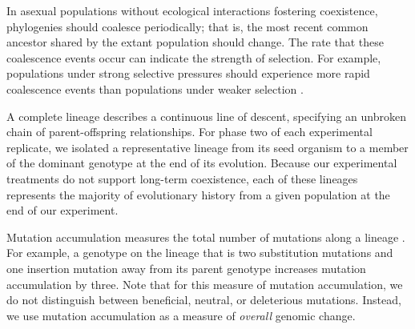 In asexual populations without ecological interactions fostering coexistence, phylogenies should coalesce periodically; that is, the most recent common ancestor shared by the extant population should change.
The rate that these coalescence events occur can indicate the strength of selection.
For example, populations under strong selective pressures should experience more rapid coalescence events than populations under weaker selection \citep{dolson_interpreting_2020}.


A complete lineage describes a continuous line of descent, specifying an unbroken chain of parent-offspring relationships.
For phase two of each experimental replicate, we isolated a representative lineage from its seed organism to a member of the dominant genotype at the end of its evolution.
Because our experimental treatments do not support long-term coexistence, each of these lineages represents the majority of evolutionary history from a given population at the end of our experiment.



Mutation accumulation measures the total number of mutations along a lineage \citep{dolson_interpreting_2020}.
For example, a genotype on the lineage that is two substitution mutations and one insertion mutation away from its parent genotype increases mutation accumulation by three.
Note that for this measure of mutation accumulation, we do not distinguish between beneficial, neutral, or deleterious mutations. 
Instead, we use mutation accumulation as a measure of \textit{overall} genomic change.


